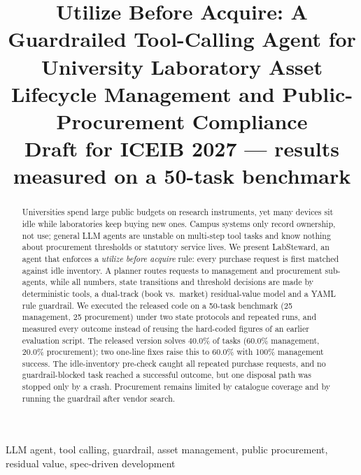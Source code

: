 \documentclass[conference]{IEEEtran}
\begin{document}
\title{Utilize Before Acquire: A Guardrailed Tool-Calling Agent for
University Laboratory Asset Lifecycle Management and Public-Procurement
Compliance\\
{\footnotesize Draft for ICEIB 2027 --- results measured on a 50-task benchmark}}

\author{
}

\maketitle

\begin{abstract}
Universities spend large public budgets on research instruments, yet
many devices sit idle while laboratories keep buying new ones.
Campus systems only record ownership, not use; general LLM agents are
unstable on multi-step tool tasks and know nothing about procurement
thresholds or statutory service lives.
We present LabSteward, an agent that enforces a \emph{utilize before
acquire} rule: every purchase request is first matched against idle
inventory.
A planner routes requests to management and procurement sub-agents,
while all numbers, state transitions and threshold decisions are made by
deterministic tools, a dual-track (book vs.\ market) residual-value model
and a YAML rule guardrail.
We executed the released code on a 50-task benchmark (25 management, 25
procurement) under two state protocols and repeated runs, and measured
every outcome instead of reusing the hard-coded figures of an earlier
evaluation script.
The released version solves 40.0\% of tasks (60.0\% management, 20.0\%
procurement); two one-line fixes raise this to 60.0\% with 100\%
management success. The idle-inventory pre-check caught all repeated
purchase requests, and no guardrail-blocked task reached a successful
outcome, but one disposal path was stopped only by a crash. Procurement
remains limited by catalogue coverage and by running the guardrail after
vendor search.
\end{abstract}

\begin{IEEEkeywords}
LLM agent, tool calling, guardrail, asset management, public procurement,
residual value, spec-driven development
\end{IEEEkeywords}
\end{document}
